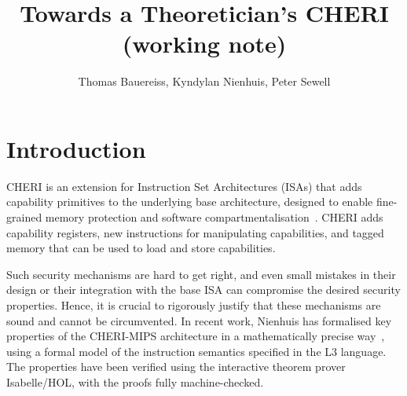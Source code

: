 \documentclass[11pt]{article}
\title{Towards a Theoretician's {CHERI}\\(working note)}
\author{Thomas Bauereiss, Kyndylan Nienhuis, Peter Sewell}
\theoremstyle{definition}
\begin{document}
\maketitle

\section{Introduction}

CHERI is an extension for Instruction Set Architectures (ISAs) that
adds ca\-pa\-bi\-li\-ty  primitives to the underlying base architecture, designed to enable fine-grained memory protection and software compartmentalisation~\cite{UCAM-CL-TR-927,2665740}.
CHERI adds capability registers, new instructions for manipulating capabilities, and tagged memory that can be used to load and store capabilities.

Such security mechanisms are %
hard to get right, and
even small mistakes in their design or their integration with the base ISA can compromise the desired security properties.
Hence, it is crucial to rigorously justify that these mechanisms are sound and cannot be circumvented. %
In recent work, Nienhuis has formalised key properties of the CHERI-MIPS architecture in a mathematically precise way~\cite{cheri-arw18}, using a formal model of the instruction semantics specified in the L3 language.
The properties have been verified using the interactive theorem prover Isabelle/HOL, with the proofs fully machine-checked.
\end{document}
